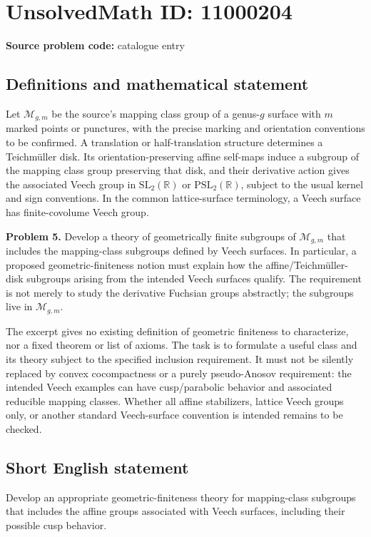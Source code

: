 \documentclass[11pt]{article}
\newcommand{\R}{\mathbb{R}}
\begin{document}
\section*{UnsolvedMath ID: 11000204}
\textbf{Source problem code:} catalogue entry
\subsection{Definitions and mathematical statement}
Let $\mathcal M_{g,m}$ be the source's mapping class group of a genus-$g$ surface with $m$ marked points or punctures, with the precise marking and orientation conventions to be confirmed. A translation or half-translation structure determines a Teichm\"uller disk. Its orientation-preserving affine self-maps induce a subgroup of the mapping class group preserving that disk, and their derivative action gives the associated Veech group in $\mathrm{SL}_2(\R)$ or $\mathrm{PSL}_2(\R)$, subject to the usual kernel and sign conventions. In the common lattice-surface terminology, a Veech surface has finite-covolume Veech group.

\textbf{Problem 5.} Develop a theory of geometrically finite subgroups of $\mathcal M_{g,m}$ that includes the mapping-class subgroups defined by Veech surfaces. In particular, a proposed geometric-finiteness notion must explain how the affine/Teichm\"uller-disk subgroups arising from the intended Veech surfaces qualify. The requirement is not merely to study the derivative Fuchsian groups abstractly; the subgroups live in $\mathcal M_{g,m}$.

The excerpt gives no existing definition of geometric finiteness to characterize, nor a fixed theorem or list of axioms. The task is to formulate a useful class and its theory subject to the specified inclusion requirement. It must not be silently replaced by convex cocompactness or a purely pseudo-Anosov requirement: the intended Veech examples can have cusp/parabolic behavior and associated reducible mapping classes. Whether all affine stabilizers, lattice Veech groups only, or another standard Veech-surface convention is intended remains to be checked.
\subsection{Short English statement}
Develop an appropriate geometric-finiteness theory for mapping-class subgroups that includes the affine groups associated with Veech surfaces, including their possible cusp behavior.
\end{document}
